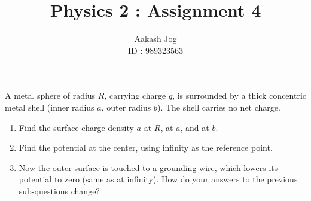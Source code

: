 \documentclass[fleqn, a4paper, 11pt, oneside]{amsart}
\title{Physics 2 : Assignment 4}
\author
{
	Aakash Jog\\
	ID : 989323563
}
\date{\formatdate{29}{4}{2015}}
\theoremstyle{definition}
\theoremstyle{theorem}
\begin{document}
\maketitle

\begin{question}
	A metal sphere of radius $R$, carrying charge $q$, is surrounded by a thick concentric metal shell (inner radius $a$, outer radius $b$).
	The shell carries no net charge.
	\begin{enumerate}
		\item Find the surface charge density $a$ at $R$, at $a$, and at $b$.
		\item Find the potential at the center, using infinity as the reference point.
		\item
			Now the outer surface is touched to a grounding wire, which lowers its potential to zero (same as at infinity).
			How do your answers to the previous sub-questions change?
	\end{enumerate}
\end{question}
\end{document}
